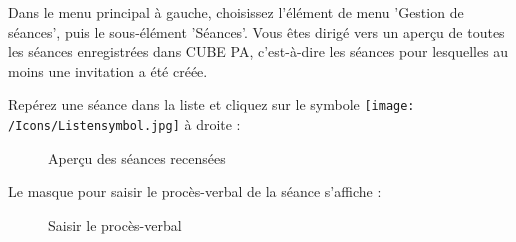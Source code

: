 Dans le menu principal à gauche, choisissez l'élément de menu 'Gestion de séances', puis le sous-élément 'Séances'. Vous êtes dirigé vers un aperçu de toutes les séances enregistrées dans CUBE PA, c'est-à-dire les séances pour lesquelles au moins une invitation a été créée. \newline

\vspace{6.5cm} 

Repérez une séance dans la liste et cliquez sur le symbole \texttt{[image: /Icons/Listensymbol.jpg]}  à droite :

\begin{figure}[H]
\caption{Aperçu des séances recensées}
\end{figure}

\vspace{\baselineskip}

Le masque pour saisir le procès-verbal de la séance s'affiche :

\begin{figure}[H]
\caption{Saisir le procès-verbal}
\end{figure}

